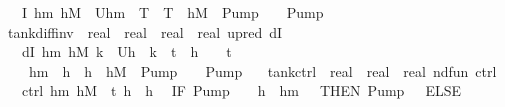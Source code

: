 \documentclass[envcountsame,envcountsect]{llncs}
\begin{document}
\begin{example}
\begin{isabellebody}
\ \ \ {\isachardoublequoteopen}I\ h\isactrlsub m\ h\isactrlsub M\ {\isasymequiv}\ U{\isacharparenleft}h\isactrlsub m\ {\isasymle}\ T\ {\isasymand}\ T\ {\isasymle}\ h\isactrlsub M\ {\isasymand}\ {\isacharparenleft}Pump\ {\isacharequal}\ {}\ {\isasymor}\ Pump\ {\isacharequal}\ {}{\isacharparenright}{\isacharparenright}{\isachardoublequoteclose}\isanewline
\isanewline
{}\isamarkupfalse%
\ tank{\isacharunderscore}diff{\isacharunderscore}inv\ {\isacharcolon}{\isacharcolon}\ {\isachardoublequoteopen}real\ {\isasymRightarrow}\ real\ {\isasymRightarrow}\ real\ {\isasymRightarrow}\ {\isacharparenleft}real{\isacharcircum}{}{\isacharparenright}\ upred{\isachardoublequoteclose}\ {\isacharparenleft}{\isachardoublequoteopen}dI{\isachardoublequoteclose}{\isacharparenright}\isanewline
\ \ \ {\isachardoublequoteopen}dI\ h\isactrlsub m\ h\isactrlsub M\ k\ {\isasymequiv}\ U{\isacharparenleft}h\ {\isacharequal}\ k\ {\isasymcdot}\ t\ {\isacharplus}\ h\ {\isasymand}\ {}\ {\isasymle}\ t\ {\isasymand}\ \isanewline
\ \ \ \ h\isactrlsub m\ {\isasymle}\ h\ {\isasymand}\ h\ {\isasymle}\ h\isactrlsub M\ {\isasymand}\ {\isacharparenleft}Pump\ {\isacharequal}\ {}\ {\isasymor}\ Pump\ {\isacharequal}\ {}{\isacharparenright}{\isacharparenright}{\isachardoublequoteclose}\isanewline
\isanewline
{}\isamarkupfalse%
\ tank{\isacharunderscore}ctrl\ {\isacharcolon}{\isacharcolon}\ {\isachardoublequoteopen}real\ {\isasymRightarrow}\ real\ {\isasymRightarrow}\ {\isacharparenleft}real{\isacharcircum}{}{\isacharparenright}\ nd{\isacharunderscore}fun{\isachardoublequoteclose}\ {\isacharparenleft}{\isachardoublequoteopen}ctrl{\isachardoublequoteclose}{\isacharparenright}\isanewline
\ \ \ {\isachardoublequoteopen}ctrl\ h\isactrlsub m\ h\isactrlsub M\ {\isasymequiv}\ {\isacharparenleft}t\ {\isacharcolon}{\isacharcolon}{\isacharequal}{}{\isacharparenright}{\isacharsemicolon}{\isacharparenleft}h\ {\isacharcolon}{\isacharcolon}{\isacharequal}\ h{\isacharparenright}{\isacharsemicolon}\isanewline
\ \ {\isacharparenleft}IF\ {\isacharparenleft}Pump\ {\isacharequal}\ {}\ {\isasymand}\ h\ {\isasymle}\ h\isactrlsub m\ {\isacharplus}\ {}{\isacharparenright}\ THEN\ {\isacharparenleft}Pump\ {\isacharcolon}{\isacharcolon}{\isacharequal}\ {}{\isacharparenright}\ ELSE\isanewline

\end{isabellebody}
\end{example}
\end{document}
